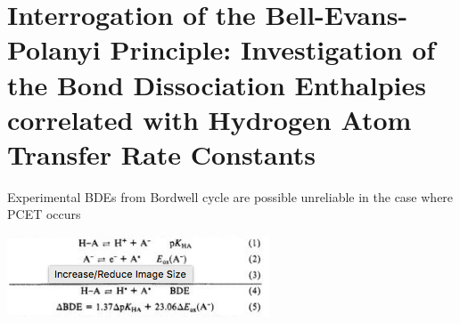 
\chapter{Interrogation of the Bell-Evans-Polanyi Principle: Investigation of the
Bond Dissociation Enthalpies correlated with Hydrogen Atom Transfer Rate Constants}
\label{ch:bde}

Experimental BDEs from Bordwell\cite{Bordwell1988} cycle are possible unreliable
in the case where PCET occurs \cite{Miller2016}

\includegraphics{figures/bordwell}

